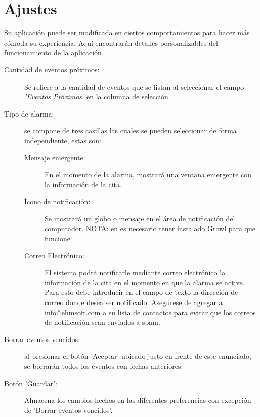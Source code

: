 \chapter{Ajustes}
\label{sec:preferencias}
Su aplicaci\'on puede ser modificada en ciertos comportamientos para hacer
m\'as c\'omoda su experiencia. Aqu\'i  encontrar\'an  detalles  personalizables del funcionamiento de la aplicaci\'on.

\begin{description}
\item[Cantidad de eventos pr\'oximos:] Se refiere a la cantidad de eventos que se listan al seleccionar el campo \emph{'Eventos Pr\'oximos'} en la columna de selecci\'on.
 \item[Tipo de alarma:]  se compone de tres casillas  las cuales se pueden seleccionar de forma independiente, estas son:
\begin{description}
     	\item[Mensaje emergente:] En el momento de la alarma, mostrar\'a una ventana emergente con la informaci\'on de la cita.
     	\item[\'Icono de notificaci\'on:] Se mostrar\'a un globo o mensaje en el \'area de notificaci\'on del computador. NOTA: en \mac es necesario tener instalado Growl para que funcione
     	\item[Correo Electr\'onico:] El sistema podr\'a notificarle mediante correo electr\'onico la informaci\'on de la cita en el momento en que la alarma se active. Para esto debe introducir en el campo de texto la direcci\'on de correo donde desea ser notificado. Aseg\'urese de agregar a info@ehmsoft.com a su lista de contactos para evitar que los correos de notificaci\'on sean enviados a spam.
\end{description}
\item[Borrar eventos vencidos:] al presionar el bot\'on 'Aceptar' ubicado justo en frente de este enunciado, se borrar\'an todos los eventos con fechas anteriores.
\item[Bot\'on 'Guardar':] Almacena los cambios hechos en las diferentes preferencias con excepci\'on de 'Borrar eventos vencidos'.
\end{description}
